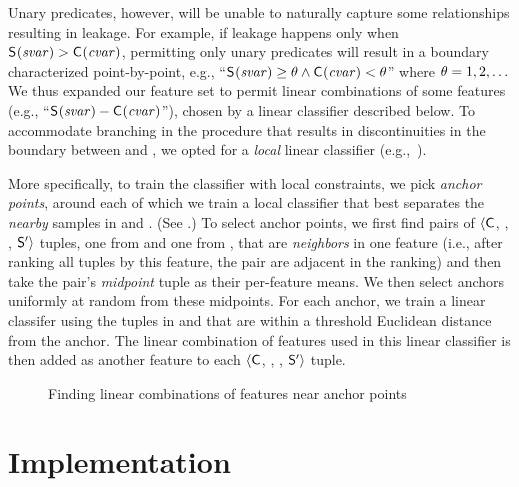 Unary predicates, however, will be unable to naturally capture some
relationships resulting in leakage.  For example, if leakage happens
only when $\mathsf{S}_{}(\mathit{svar})> \mathsf{C}_{}(\mathit{cvar})$, permitting
only unary predicates will result in a boundary characterized
point-by-point, e.g., ``$\mathsf{S}_{}(\mathit{svar}) \geq \theta
\wedge \mathsf{C}_{}(\mathit{cvar})< \theta$'' where
$\theta = 1, 2, \ldots$ We thus expanded our feature set
to permit linear combinations of some features (e.g.,
``$\mathsf{S}_{}(\mathit{svar}) - \mathsf{C}_{}(\mathit{cvar})$''), chosen by a
linear classifier described below.  To accommodate branching in the
procedure that results in discontinuities in the boundary between
\interferenceSet and \noninterferenceSet, we opted for a
\textit{local} linear classifier (e.g.,~\cite{fan1993local,
ribeiro2018anchors}).

More specifically, to train the classifier with local constraints, we
pick \textit{anchor points}, around each of which we train a local
classifier that best separates the \textit{nearby} samples in
\interferenceSetSamples and \noninterferenceSetSamples.  (See
.)  To select anchor points, we first find
pairs of $\langle\mathsf{C}_{}$, \AIIFn{}, \SecFn{}, $\mathsf{S}'_{}\rangle$
tuples, one from \interferenceSetSamples and one from
\noninterferenceSetSamples, that are \textit{neighbors} in one feature
(i.e., after ranking all tuples by this feature, the pair are adjacent
in the ranking) and then take the pair's \textit{midpoint} tuple as
their per-feature means.  We then select anchors uniformly at random
from these midpoints.  For each anchor, we train a linear classifer
using the tuples in \interferenceSetSamples and
\noninterferenceSetSamples that are within a threshold Euclidean
distance from the anchor.  The linear combination of features used in
this linear classifier is then added as another feature to each
$\langle\mathsf{C}_{}$, \AIIFn{}, \SecFn{}, $\mathsf{S}'_{}\rangle$ tuple.

\begin{figure}
\centering
\resizebox{0.7\linewidth}{!}
{\protect\small{}}
\caption{Finding linear combinations of features near anchor points
\label{fig:linearfeature}}
\vspace{-4ex}
\end{figure}

\section{Implementation}
\label{dinome:sec:impl}


